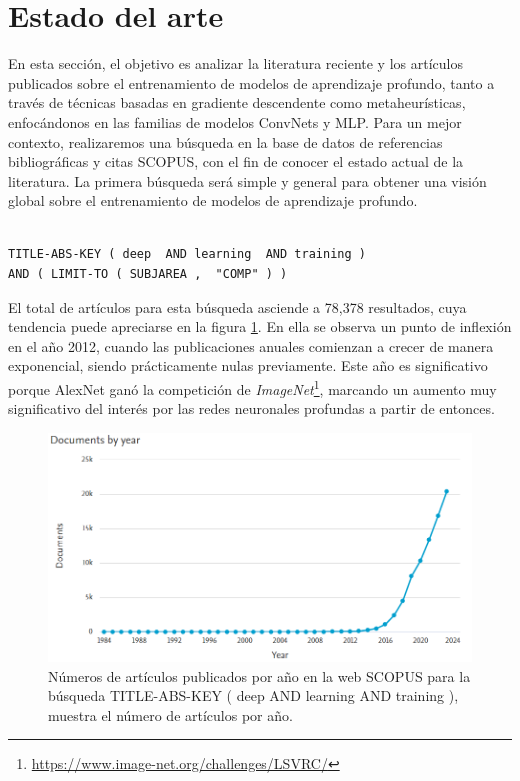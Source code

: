 \section{Estado del arte}

En esta sección, el objetivo es analizar la literatura reciente y los artículos publicados sobre el entrenamiento de modelos de aprendizaje profundo, tanto a través de técnicas basadas en gradiente descendente como metaheurísticas, enfocándonos en las familias de modelos ConvNets y MLP. Para un mejor contexto, realizaremos una búsqueda en la base de datos de referencias bibliográficas y citas SCOPUS, con el fin de conocer el estado actual de la literatura. La primera búsqueda será simple y general para obtener una visión global sobre el entrenamiento de modelos de aprendizaje profundo.


\begin{verbatim}

TITLE-ABS-KEY ( deep  AND learning  AND training )
AND ( LIMIT-TO ( SUBJAREA ,  "COMP" ) ) 

\end{verbatim}


El total de artículos para esta búsqueda asciende a 78,378 resultados, cuya tendencia puede apreciarse en la figura \ref{fig:scopus_deep}. En ella se observa un punto de inflexión en el año 2012, cuando las publicaciones anuales comienzan a crecer de manera exponencial, siendo prácticamente nulas previamente. Este año es significativo porque AlexNet ganó la competición de \textit{ImageNet}\footnote{\url{https://www.image-net.org/challenges/LSVRC/}}, marcando un aumento muy significativo del interés por las redes neuronales profundas a partir de entonces.

\begin{figure}
    \centering
    \includegraphics[width=0.75\linewidth]{Plantilla_TFG_latex//imagenes//Inf//EdA/scopus_deep.png}
    \caption{Números de artículos publicados por año en la web SCOPUS para la búsqueda TITLE-ABS-KEY ( deep  AND learning  AND training ), muestra el número de artículos por año.}
    \label{fig:scopus_deep}
\end{figure}

